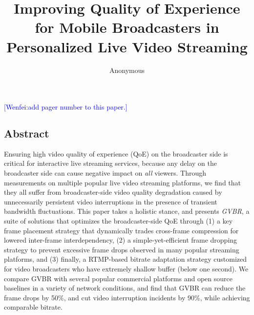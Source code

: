 \documentclass[conference]{IEEEtran}
\newcommand{\wenfei}[1]{\textcolor{blue}{[Wenfei:#1]}}
\newcommand{\wenfei}[1]{}
\begin{document}


\title{Improving Quality of Experience for Mobile Broadcasters in Personalized Live Video Streaming}

\author{Anonymous}

\maketitle



\wenfei{add pager number to this paper.}
\subsection*{Abstract}
Ensuring high video quality of experience (QoE) on the broadcaster side is
critical for interactive live streaming services, because any delay on the
broadcaster side can cause negative impact on {\em all} viewers. Through
measurements on multiple popular live video streaming platforms, we find
that they all suffer from broadcaster-side video quality degradation caused
by unnecessarily persistent video interruptions in the presence of transient
bandwidth fluctuations. This paper takes a holistic stance, and presents
{\em GVBR}, a suite of solutions that optimizes the broadcaster-side QoE
through (1) a key frame placement strategy that dynamically trades
cross-frame compression for lowered inter-frame interdependency, (2) a
simple-yet-efficient frame dropping strategy to prevent excessive frame
drops observed in many popular streaming platforms, and (3) finally, a
RTMP-based bitrate adaptation strategy customized for video broadcasters
who have extremely shallow buffer (below one second).
We compare GVBR with several popular commercial platforms and open source
baselines in a variety of network conditions, and find that GVBR can reduce
the frame drops by 50\%, and cut video interruption incidents by 90\%, while
achieving comparable bitrate.




%










\begin{small}

\end{small}
\label{last-page}
\end{document}
